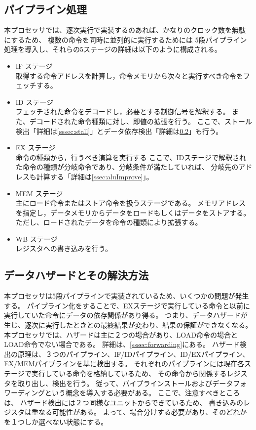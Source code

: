 \documentclass[../main.tex]{subfiles}
\begin{document}
    \subsection{パイプライン処理}
    本プロセッサでは、逐次実行で実装するのあれば、かなりのクロック数を無駄にするため、
    複数の命令を同時に並列的に実行するためには
    5段パイプライン処理を導入し、それらの5ステージの詳細は以下のように構成される。

    \begin{itemize}
        \item IF ステージ \\
            取得する命令アドレスを計算し，命令メモリから次々と実行すべき命令をフェッチする。
        \item ID ステージ \\
            フェッチされた命令をデコードし，必要とする制御信号を解釈する。
            また、デコードされた命令種類に対し、即値の拡張を行う。
            ここで、ストール検出「詳細は\ref{sssec:stall}」とデータ依存検出「詳細は\ref{ssec:hazard}」も行う。
        \item EX ステージ \\
            命令の種類から，行うべき演算を実行する
            ここで、IDステージで解釈された命令の種類が分岐命令であり、分岐条件が満たしていれば、
            分岐先のアドレスも計算する「詳細は\ref{ssec:aluImprove}」。
        \item MEM ステージ \\
           主にロード命令またはストア命令を扱うステージである。
           メモリアドレスを指定し，データメモリからデータをロードもしくはデータをストアする。
           ただし、ロードされたデータを命令の種類により拡張する。
        \item WB ステージ \\
            レジスタへの書き込みを行う。
    \end{itemize}

    \subsection{データハザードとその解決方法} \label{ssec:hazard}
        本プロセッサは5段パイプラインで実装されているため、いくつかの問題が発生する。
        パイプライン化をすることで、EXステージで実行している命令と以前に実行していた命令にデータの依存関係があり得る。
        つまり、データハザードが生じ、逐次に実行したときとの最終結果が変わり、結果の保証ができなくなる。
        本プロセッサでは、ハザードは主に２つの場合があり、LOAD命令の場合とLOAD命令でない場合である。
        詳細は、\ref{sssec:forwarding}にある。
        ハザード検出の原理は、３つのパイプライン、IF/IDパイプライン、ID/EXパイプライン、EX/MEMパイプラインを基に検出する。
        それぞれのパイプラインには現在各ステージで実行している命令を格納しているため、
        その命令から関係するレジスタを取り出し、検出を行う。
        従って、パイプラインストールおよびデータフォワーディングという概念を導入する必要がある。
        ここで、注意すべきところは、
        ハザード検出には２つ同様なユニットからできているため、
        書き込みのレジスタは重なる可能性がある。
        よって、場合分けする必要があり、そのどれかを１つしか選べない状態にする。
\end{document}
